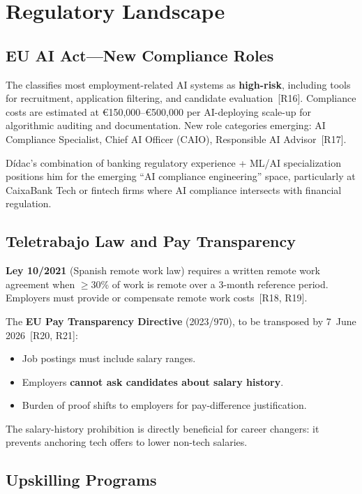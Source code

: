 \documentclass[a4paper,11pt,openany]{report}
\begin{document}
\section{Regulatory Landscape}

\subsection{EU AI Act---New Compliance Roles}

The  classifies most employment-related AI systems as
\textbf{high-risk}, including tools for recruitment, application filtering, and
candidate evaluation~[R16]. Compliance costs are estimated at
€150,000--€500,000 per AI-deploying scale-up for algorithmic auditing and
documentation. New role categories emerging: AI Compliance Specialist, Chief AI
Officer (CAIO), Responsible AI Advisor~[R17].

Dídac's combination of banking regulatory experience + ML/AI specialization
positions him for the emerging ``AI compliance engineering'' space, particularly
at CaixaBank Tech or fintech firms where AI compliance intersects with
financial regulation.

\subsection{Teletrabajo Law and Pay Transparency}

\textbf{Ley 10/2021} (Spanish remote work law) requires a written remote work
agreement when $\geq$30\% of work is remote over a 3-month reference period.
Employers must provide or compensate remote work costs~[R18, R19].

The \textbf{EU Pay Transparency Directive} (2023/970), to be transposed by
7~June 2026~[R20, R21]:
\begin{itemize}
  \item Job postings must include salary ranges.
  \item Employers \textbf{cannot ask candidates about salary history}.
  \item Burden of proof shifts to employers for pay-difference justification.
\end{itemize}

The salary-history prohibition is directly beneficial for career changers:
it prevents anchoring tech offers to lower non-tech salaries.

\subsection{Upskilling Programs}
\end{document}
